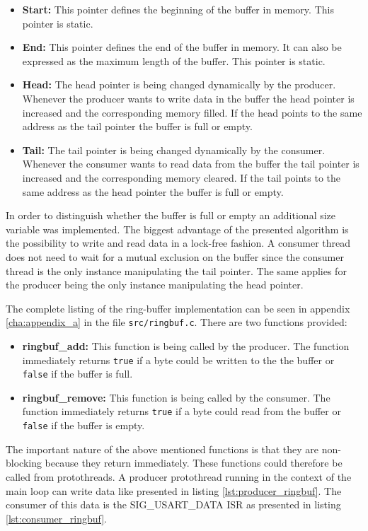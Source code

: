 \begin{itemize}
    \item \textbf{Start:} This pointer defines the beginning of the buffer in memory. This pointer is static.
    \item \textbf{End:} This pointer defines the end of the buffer in memory. It can also be expressed as the maximum length of the buffer. This pointer is static.
    \item \textbf{Head:} The head pointer is being changed dynamically by the producer. Whenever the producer wants to write data in the buffer the head pointer is increased and the corresponding memory filled. If the head points to the same address as the tail pointer the buffer is full or empty.
    \item \textbf{Tail:} The tail pointer is being changed dynamically by the consumer. Whenever the consumer wants to read data from the buffer the tail pointer is increased and the corresponding memory cleared. If the tail points to the same address as the head pointer the buffer is full or empty.
\end{itemize}

In order to distinguish whether the buffer is full or empty an additional size variable was implemented. The biggest advantage of the presented algorithm is the possibility to write and read data in a lock-free fashion. A consumer thread does not need to wait for a mutual exclusion on the buffer since the consumer thread is the only instance manipulating the tail pointer. The same applies for the producer being the only instance manipulating the head pointer.

The complete listing of the ring-buffer implementation can be seen in appendix \ref{cha:appendix_a} in the file \texttt{src/ringbuf.c}. There are two functions provided:

\begin{itemize}
    \item \textbf{ringbuf\_add:} This function is being called by the producer. The function immediately returns \texttt{true} if a byte could be written to the the buffer or \texttt{false} if the buffer is full.
    \item \textbf{ringbuf\_remove:} This function is being called by the consumer. The function immediately returns \texttt{true} if a byte could read from the buffer or \texttt{false} if the buffer is empty.
\end{itemize}

The important nature of the above mentioned functions is that they are non-blocking because they return immediately. These functions could therefore be called from protothreads. A producer protothread running in the context of the main loop can write data like presented in listing \ref{lst:producer_ringbuf}. The consumer of this data is the SIG\_USART\_DATA ISR as presented in listing \ref{lst:consumer_ringbuf}.


